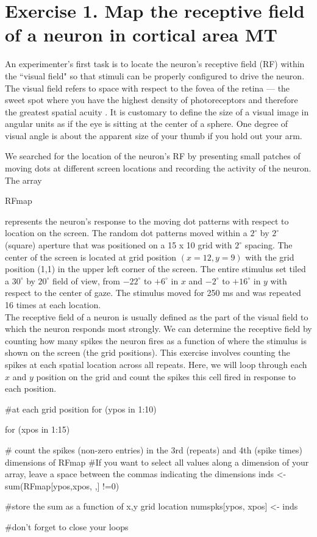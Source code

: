 \documentclass[
letterpaper, %
11pt, %
 oneside, 
onecolumn, %
]{memoir}
\numberwithin{Exercise}{chapter}
\begin{document}
\section{Exercise 1.   Map the receptive field of a neuron in cortical area MT}

An experimenter's first task is to locate the neuron's receptive field (RF) within the ``visual field" so that stimuli can be properly configured to drive the neuron.   The visual field refers to space with respect to the fovea of the retina --- the sweet spot where you have the highest density of photoreceptors and therefore the greatest spatial acuity .  It is customary to define the size of a visual image in angular units as if the eye is sitting at the center of a sphere.  One degree of visual angle is about the apparent size of your thumb if you hold out your arm.


We searched for the location of the neuron's RF by presenting small patches of moving dots at different screen locations and recording the activity of the neuron.   The array \begin{ttfamily}RFmap\end{ttfamily} represents the neuron's response to the moving dot patterns with respect to location on the screen.  The random dot patterns moved within a $2^{\circ}$ by $2^{\circ}$ (square) aperture that was positioned on a 15 x 10 grid with $2^{\circ}$ spacing.  The center of the screen is located at grid position
 $(x=12, y=9)$ with the grid position (1,1) in the upper left corner of the screen.  The entire stimulus set tiled a $30^{\circ}$ by $20^{\circ}$ field of view, from $-22^{\circ}$ to $+6^{\circ}$ in $x$ and  $-2^{\circ}$ to $+16^{\circ}$ in $y$ with respect to the center of gaze.  The stimulus moved for 250 ms and was repeated 16 times at each location.   \\
 

The receptive field of a neuron is usually defined as the part of the visual field to which the neuron responds most strongly. We can determine the receptive field by counting how many spikes the neuron fires as a function of where the stimulus is shown on the screen (the grid positions).   This exercise involves counting the spikes at each spatial location across all repeats. Here, we will loop through each $x$ and $y$ position on the grid and count the spikes this cell fired in response to each position. 

\begin{shortrcode}
#at each grid position
for (ypos in 1:10){
	for (xpos in 1:15){

# count the spikes (non-zero entries) in the 3rd (repeats) and 4th (spike times) dimensions of RFmap
#If you want to select all values along a dimension of your array, leave a space between the commas indicating the dimensions
		inds <- sum(RFmap[ypos,xpos, ,] !=0)

		#store the sum as a function of x,y grid location	
		numspks[ypos, xpos] <- inds
	} #don't forget to close your loops
}
\end{shortrcode}
\end{document}
